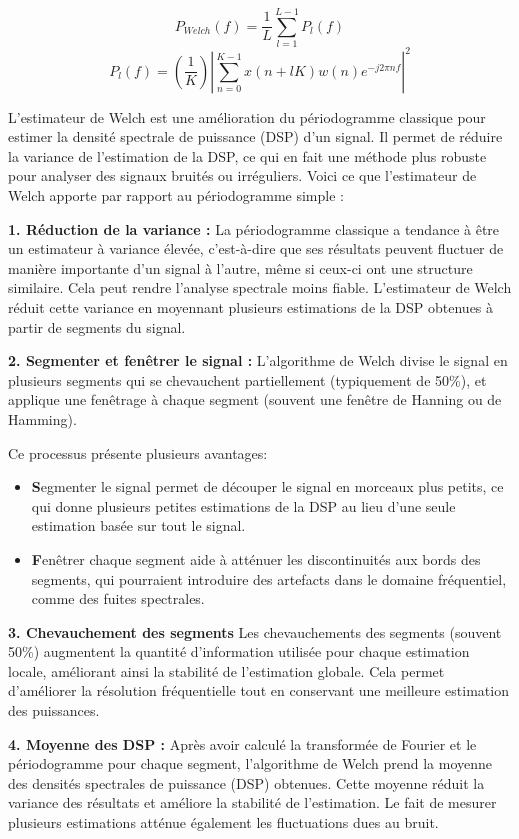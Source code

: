 \[
P_{Welch}(f) = \frac{1}{L} \sum_{l=1}^{L-1}P_l(f) \tag{17}
\]
\[
P_l(f) = \left( \frac{1}{K}\right) \left |\sum_{n=0}^{K-1} x(n+lK) w(n) e^{-j2\pi nf} \right |^2 \tag{18}
\]

L'estimateur de Welch est une amélioration du périodogramme classique pour estimer la densité spectrale de puissance (DSP) d'un signal. 
Il permet de réduire la variance de l'estimation de la DSP, ce qui en fait une méthode plus robuste pour analyser des signaux bruités ou irréguliers. 
Voici ce que l'estimateur de Welch apporte par rapport au périodogramme simple :

\textbf{1. Réduction de la variance :}
La périodogramme classique a tendance à être un estimateur à variance élevée, c'est-à-dire que ses résultats peuvent fluctuer de manière importante d'un signal à l'autre, même si ceux-ci ont une structure similaire. 
Cela peut rendre l'analyse spectrale moins fiable. 
L'estimateur de Welch réduit cette variance en moyennant plusieurs estimations de la DSP obtenues à partir de segments du signal.

\textbf{2. Segmenter et fenêtrer le signal :}
L'algorithme de Welch divise le signal en plusieurs segments qui se chevauchent partiellement (typiquement de 50\%), et applique une fenêtrage à chaque segment (souvent une fenêtre de Hanning ou de Hamming). 

Ce processus présente plusieurs avantages:
\begin{itemize}
    \item \textbf Segmenter le signal permet de découper le signal en morceaux plus petits, ce qui donne plusieurs petites estimations de la DSP au lieu d'une seule estimation basée sur tout le signal.
    \item \textbf Fenêtrer chaque segment aide à atténuer les discontinuités aux bords des segments, qui pourraient introduire des artefacts dans le domaine fréquentiel, comme des fuites spectrales.
\end{itemize}

\textbf{3. Chevauchement des segments}
Les chevauchements des segments (souvent 50\%) augmentent la quantité d'information utilisée pour chaque estimation locale, améliorant ainsi la stabilité de l'estimation globale. 
Cela permet d'améliorer la résolution fréquentielle tout en conservant une meilleure estimation des puissances.

\textbf{4. Moyenne des DSP :}
Après avoir calculé la transformée de Fourier et le périodogramme pour chaque segment, l'algorithme de Welch prend la moyenne des densités spectrales de puissance (DSP) obtenues. 
Cette moyenne réduit la variance des résultats et améliore la stabilité de l'estimation. 
Le fait de mesurer plusieurs estimations atténue également les fluctuations dues au bruit.

